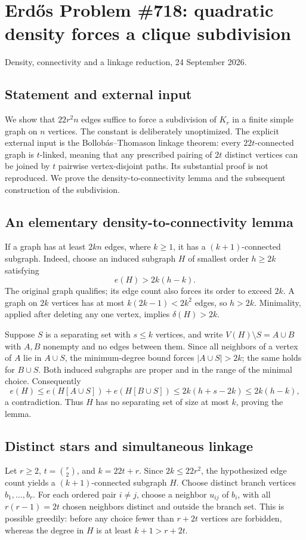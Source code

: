 \section{Erd\H{o}s Problem \#718: quadratic density forces a clique subdivision}
\noindent Density, connectivity and a linkage reduction, 24 September 2026.

\subsection*{Statement and external input}
We show that $22r^2n$ edges suffice to force a subdivision of $K_r$ in a finite simple graph on $n$ vertices. The constant is deliberately unoptimized.
The explicit external input is the Bollob\'as--Thomason linkage theorem: every $22t$-connected graph is $t$-linked, meaning that any prescribed pairing of $2t$ distinct vertices can be joined by $t$ pairwise vertex-disjoint paths. Its substantial proof is not reproduced. We prove the density-to-connectivity lemma and the subsequent construction of the subdivision.

\subsection*{An elementary density-to-connectivity lemma}
If a graph has at least $2kn$ edges, where $k\geq1$, it has a $(k+1)$-connected subgraph. Indeed, choose an induced subgraph $H$ of smallest order $h\geq2k$ satisfying
\[
 e(H)>2k(h-k).
\]
The original graph qualifies; its edge count also forces its order to exceed $2k$. A graph on $2k$ vertices has at most $k(2k-1)<2k^2$ edges, so $h>2k$. Minimality, applied after deleting any one vertex, implies $\delta(H)>2k$.

Suppose $S$ is a separating set with $s\leq k$ vertices, and write $V(H)\setminus S=A\cup B$ with $A,B$ nonempty and no edges between them. Since all neighbors of a vertex of $A$ lie in $A\cup S$, the minimum-degree bound forces $|A\cup S|>2k$; the same holds for $B\cup S$. Both induced subgraphs are proper and in the range of the minimal choice. Consequently
\[
 e(H)\leq e(H[A\cup S])+e(H[B\cup S])
 \leq2k(h+s-2k)\leq2k(h-k),
\]
a contradiction. Thus $H$ has no separating set of size at most $k$, proving the lemma.

\subsection*{Distinct stars and simultaneous linkage}
Let $r\geq2$, $t=\binom r2$, and $k=22t+r$. Since $2k\leq22r^2$, the hypothesized edge count yields a $(k+1)$-connected subgraph $H$.
Choose distinct branch vertices $b_1,\ldots,b_r$. For each ordered pair $i\ne j$, choose a neighbor $u_{ij}$ of $b_i$, with all $r(r-1)=2t$ chosen neighbors distinct and outside the branch set. This is possible greedily: before any choice fewer than $r+2t$ vertices are forbidden, whereas the degree in $H$ is at least $k+1>r+2t$.

